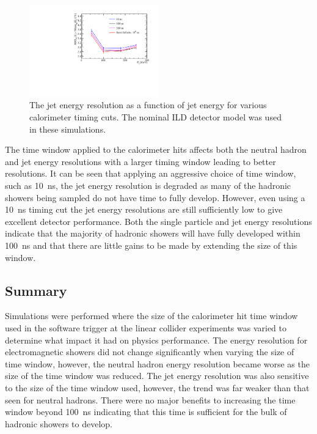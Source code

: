 \begin{figure}[h!]
\includegraphics[width=0.5\textwidth]{EnergyEstimators/Plots/TimingCuts/JER_vs_JetEnergy_TimingCutStudies.pdf}
\caption[The jet energy resolution as a function of jet energy for various calorimeter timing cuts.  The nominal ILD detector model was used in these simulations.]{The jet energy resolution as a function of jet energy for various calorimeter timing cuts.  The nominal ILD detector model was used in these simulations.}
\label{fig:jertimingcuts}
\end{figure}

The time window applied to the calorimeter hits affects both the neutral hadron and jet energy resolutions with a larger timing window leading to better resolutions.  It can be seen that applying an aggressive choice of time window, such as 10~ns, the jet energy resolution is degraded as many of the hadronic showers being sampled do not have time to fully develop.  However, even using a 10~ns timing cut the jet energy resolutions are still sufficiently low to give excellent detector performance.  Both the single particle and jet energy resolutions indicate that the majority of hadronic showers will have fully developed within 100~ns and that there are little gains to be made by extending the size of this window.  


\subsection{Summary}
Simulations were performed where the size of the calorimeter hit time window used in the software trigger at the linear collider experiments was varied to determine what impact it had on physics performance.  The energy resolution for electromagnetic showers did not change significantly when varying the size of time window, however, the neutral hadron energy resolution became worse as the size of the time window was reduced.  The jet energy resolution was also sensitive to the size of the time window used, however, the trend was far weaker than that seen for neutral hadrons.  There were no major benefits to increasing the time window beyond 100~ns indicating that this time is sufficient for the bulk of hadronic showers to develop.

